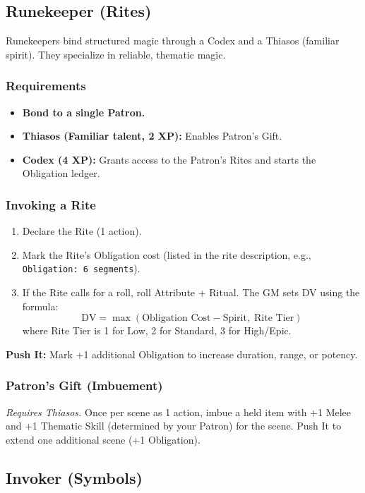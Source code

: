\subsection{Runekeeper (Rites)}

Runekeepers bind structured magic through a Codex and a Thiasos (familiar spirit). They specialize in reliable, thematic magic.

\subsubsection{Requirements}
\begin{itemize}
  \item \textbf{Bond to a single Patron.}
  \item \textbf{Thiasos (Familiar talent, 2 XP):} Enables Patron's Gift.
  \item \textbf{Codex (4 XP):} Grants access to the Patron's Rites and starts the Obligation ledger.
\end{itemize}

\subsubsection{Invoking a Rite}
\begin{enumerate}
  \item Declare the Rite (1 action).
  \item Mark the Rite's Obligation cost (listed in the rite description, e.g., \texttt{Obligation: 6 segments}).
  \item If the Rite calls for a roll, roll Attribute + Ritual. The GM sets DV using the formula:
  \[
  \text{DV} = \max(\text{Obligation Cost} - \text{Spirit},\; \text{Rite Tier})
  \]
  where Rite Tier is 1 for Low, 2 for Standard, 3 for High/Epic.
\end{enumerate}

\textbf{Push It:} Mark +1 additional Obligation to increase duration, range, or potency.

\subsubsection{Patron's Gift (Imbuement)}
\textit{Requires Thiasos.} Once per scene as 1 action, imbue a held item with +1 Melee and +1 Thematic Skill (determined by your Patron) for the scene. Push It to extend one additional scene (+1 Obligation).

\subsection{Invoker (Symbols)}

